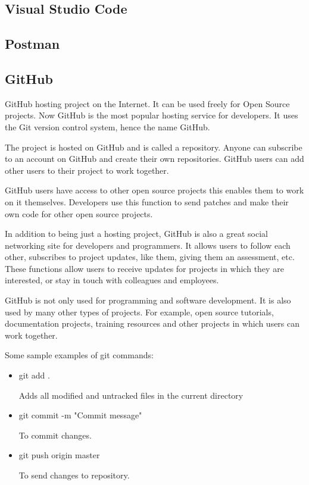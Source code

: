 \subsection{Visual Studio Code}

\subsection{Postman}

\subsection{GitHub}
GitHub hosting project on the Internet. It can be used freely for Open Source projects. Now GitHub is the most popular hosting service for developers. It uses the Git version control system, hence the name GitHub.\par

The project is hosted on GitHub and is called a repository. Anyone can subscribe to an account on GitHub and create their own repositories. GitHub users can add other users to their project to work together.\par

GitHub users have access to other open source projects this enables them to work on it themselves. Developers use this function to send patches and make their own code for other open source projects.\par 

In addition to being just a hosting project, GitHub is also a great social networking site for developers and programmers. It allows users to follow each other, subscribes to project updates, like them, giving them an assessment, etc. These functions allow users to receive updates for projects in which they are interested, or stay in touch with colleagues and employees.\par

GitHub is not only used for programming and software development. It is also used by many other types of projects. For example, open source tutorials, documentation projects, training resources and other projects in which users can work together.\cite{GitHub}\par

Some sample examples of git commands:
\begin{itemize}

    \item git add .\par
    Adds all modified and untracked files in the current directory
    
    \item git commit -m "Commit message"\par
    To commit changes.
    
    \item git push origin master\par
    To send changes to repository. 
\end{itemize}

